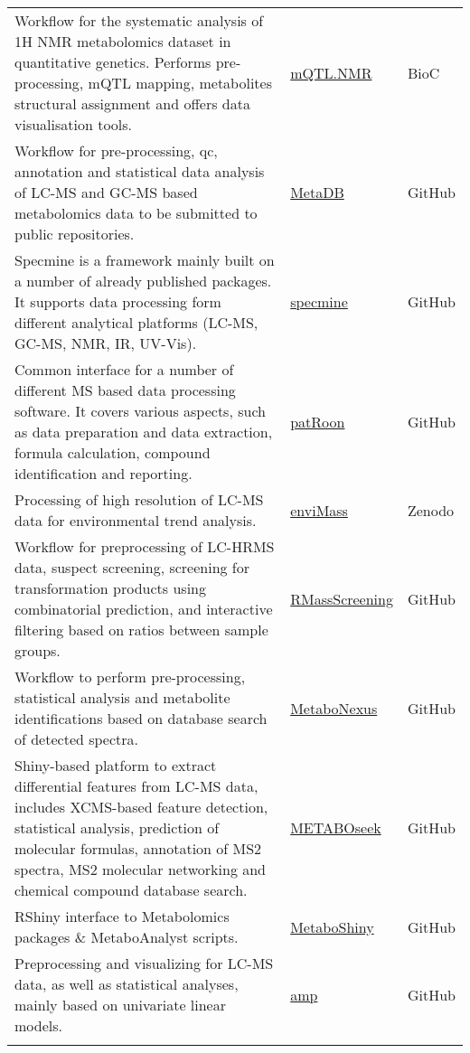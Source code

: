 \documentclass[]{article}
\begin{document}
\begin{longtable}{>{\raggedright\arraybackslash}p{30em}>{\raggedright\arraybackslash}p{10em}>{\raggedright\arraybackslash}p{3em}}
Workflow for the systematic analysis of 1H NMR metabolomics dataset in quantitative genetics. Performs pre-processing, mQTL mapping, metabolites structural assignment and offers data visualisation tools. & \href{https://www.bioconductor.org/packages/3.5/bioc/html/mQTL.NMR.html}{mQTL.NMR} & BioC\\
\rowcolor{gray!6}  Workflow for pre-processing, qc, annotation and statistical data analysis of LC-MS and GC-MS based metabolomics data to be submitted to public repositories. & \href{https://github.com/rmylonas/MetaDB}{MetaDB} & GitHub\\
Specmine is a framework mainly built on a number of already published packages. It supports data processing form different analytical platforms (LC-MS, GC-MS, NMR, IR, UV-Vis). & \href{https://github.com/cran/specmine}{specmine} & GitHub\\
\rowcolor{gray!6}  Common interface for a number of different MS based data processing software. It covers various aspects, such as data preparation and data extraction, formula calculation, compound identification and reporting. & \href{https://github.com/rickhelmus/patRoon}{patRoon} & GitHub\\
Processing of high resolution of LC-MS data for environmental trend analysis. & \href{https://zenodo.org/record/1213098}{enviMass} & Zenodo\\
\addlinespace
\rowcolor{gray!6}  Workflow for preprocessing of LC-HRMS data, suspect screening, screening for transformation products using combinatorial prediction, and interactive filtering based on ratios between sample groups. & \href{https://github.com/meowcat/RMassScreening}{RMassScreening} & GitHub\\
Workflow to perform pre-processing, statistical analysis and metabolite identifications based on database search of detected spectra. & \href{https://github.com/tohweizhong/MetaboNexus}{MetaboNexus} & GitHub\\
\rowcolor{gray!6}  Shiny-based platform to extract differential features from LC-MS data, includes XCMS-based feature detection, statistical analysis, prediction of molecular formulas, annotation of MS2 spectra, MS2 molecular networking and chemical compound database search. & \href{https://github.com/mjhelf/METABOseek}{METABOseek} & GitHub\\
RShiny interface to Metabolomics packages {\&} MetaboAnalyst scripts. & \href{https://github.com/UMCUGenetics/MetaboShiny/}{MetaboShiny} & GitHub\\
\rowcolor{gray!6}  Preprocessing and visualizing for LC-MS data, as well as statistical analyses, mainly based on univariate linear models. & \href{https://github.com/antonvsdata/amp}{amp} & GitHub\\*
\end{longtable}
\end{document}
